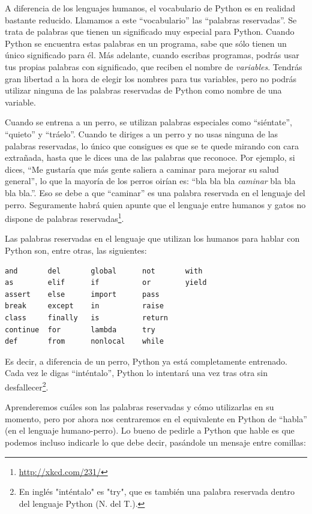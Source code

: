  

A diferencia de los lenguajes humanos, el vocabulario de Python es en
realidad bastante reducido. Llamamos a este ``vocabulario'' las
``palabras reservadas''. Se trata de palabras que tienen un significado
muy especial para Python. Cuando Python se encuentra estas palabras en
un programa, sabe que sólo tienen un único significado para él. Más
adelante, cuando escribas programas, podrás usar tus propias palabras
con significado, que reciben el nombre de \emph{variables}. Tendrás gran
libertad a la hora de elegir los nombres para tus variables, pero no
podrás utilizar ninguna de las palabras reservadas de Python como nombre
de una variable.

Cuando se entrena a un perro, se utilizan palabras especiales como
``siéntate'', ``quieto'' y ``tráelo''. Cuando te diriges a un perro y no
usas ninguna de las palabras reservadas, lo único que consigues es que
se te quede mirando con cara extrañada, hasta que le dices una de las
palabras que reconoce. Por ejemplo, si dices, ``Me gustaría que más
gente saliera a caminar para mejorar su salud general'', lo que la
mayoría de los perros oirían es: ``bla bla bla \emph{caminar} bla bla
bla bla.''. Eso se debe a que ``caminar'' es una palabra reservada en el
lenguaje del perro. Seguramente habrá quien apunte que el lenguaje entre
humanos y gatos no dispone de palabras reservadas\footnote{\url{http://xkcd.com/231/}}.

Las palabras reservadas en el lenguaje que utilizan los humanos para
hablar con Python son, entre otras, las siguientes:

\begin{verbatim}
and       del       global      not       with
as        elif      if          or        yield
assert    else      import      pass      
break     except    in          raise
class     finally   is          return
continue  for       lambda      try
def       from      nonlocal    while    
\end{verbatim}

Es decir, a diferencia de un perro, Python ya está completamente
entrenado. Cada vez le digas ``inténtalo'', Python lo intentará una vez
tras otra sin desfallecer\footnote{
En inglés "inténtalo" es "try", que es también una palabra reservada dentro del
lenguaje Python (N. del T.).}.

Aprenderemos cuáles son las palabras reservadas y cómo utilizarlas en su
momento, pero por ahora nos centraremos en el equivalente en Python de
``habla'' (en el lenguaje humano-perro). Lo bueno de pedirle a Python
que hable es que podemos incluso indicarle lo que debe decir, pasándole
un mensaje entre comillas:

